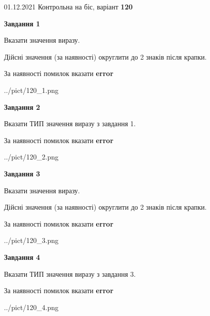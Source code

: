 \documentclass[11pt, ukrainian]{article}
\begin{document}
{01.12.2021 Контрольна на біс, варіант  \No \textbf { 120 }\par}
{
\begin {large}
{\begin {center}\textbf{Завдання 1}\end {center}}\par
Вказати значення виразу. \par
Дійсні значення (за наявності) округлити до 2 знаків після крапки. \par
За наявності помилок вказати \textbf{error}

\begin{center}
	{../pict/120_1.png}
\end{center}
\newpage

{\begin {center}\textbf{Завдання 2}\end {center}}\par
Вказати ТИП значення виразу з завдання 1. \par
За наявності помилок вказати \textbf{error}

\begin{center}
	{../pict/120_2.png}
\end{center}
\newpage

{\begin {center}\textbf{Завдання 3}\end {center}}\par
Вказати значення виразу. \par
Дійсні значення (за наявності) округлити до 2 знаків після крапки. \par
За наявності помилок вказати \textbf{error}

\begin{center}
	{../pict/120_3.png}
\end{center}
\newpage

{\begin {center}\textbf{Завдання 4}\end {center}}\par
Вказати ТИП значення виразу з завдання 3. \par
За наявності помилок вказати \textbf{error}

\begin{center}
	{../pict/120_4.png}
\end{center}
\newpage


\end{large}}
\end{document}
